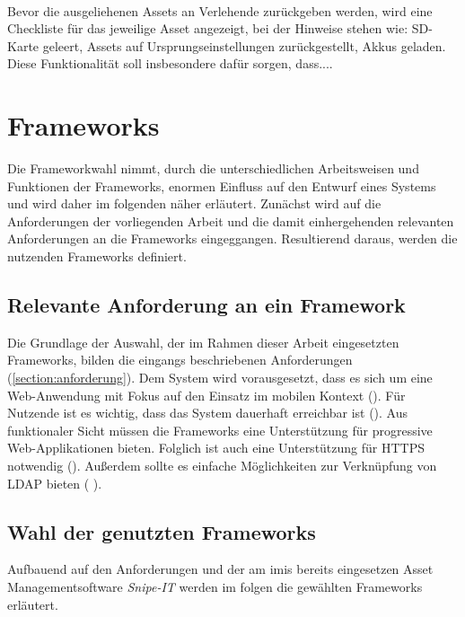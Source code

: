     {\sffamily\color{maincolor}{Ft-A-7 | Rückgabe-Checkliste}}\\
Bevor die ausgeliehenen Assets an Verlehende zurückgeben werden, wird eine
Checkliste für das jeweilige Asset angezeigt, bei der Hinweise stehen wie:
SD-Karte geleert, Assets auf Ursprungseinstellungen zurückgestellt, Akkus
geladen. Diese Funktionalität soll insbesondere dafür sorgen, dass....

\section{Frameworks}
\label{section:frameworks}
Die Frameworkwahl nimmt, durch die unterschiedlichen Arbeitsweisen und Funktionen
der Frameworks, enormen Einfluss auf den Entwurf eines Systems und wird daher im
folgenden näher erläutert. Zunächst wird auf die Anforderungen der vorliegenden
Arbeit und die damit einhergehenden relevanten Anforderungen an die Frameworks
eingeggangen. Resultierend daraus, werden die nutzenden Frameworks definiert.

\subsection{Relevante Anforderung an ein Framework}
Die Grundlage der Auswahl, der im Rahmen dieser Arbeit eingesetzten Frameworks,
bilden die eingangs beschriebenen Anforderungen (\ref{section:anforderung}). Dem
System wird vorausgesetzt, dass es sich um eine Web-Anwendung mit Fokus auf den
Einsatz im mobilen Kontext (). Für Nutzende ist es
wichtig, dass das System dauerhaft erreichbar ist (). Aus
funktionaler Sicht müssen die Frameworks eine Unterstützung für progressive
Web-Applikationen bieten. Folglich ist auch eine Unterstützung für HTTPS
notwendig (). Außerdem sollte es einfache Möglichkeiten zur
Verknüpfung von LDAP bieten ( ).

\subsection{Wahl der genutzten Frameworks}
Aufbauend auf den Anforderungen und der am \ac{imis} bereits eingesetzen Asset
Managementsoftware \textit{Snipe-IT} werden im folgen die gewählten Frameworks
erläutert.

